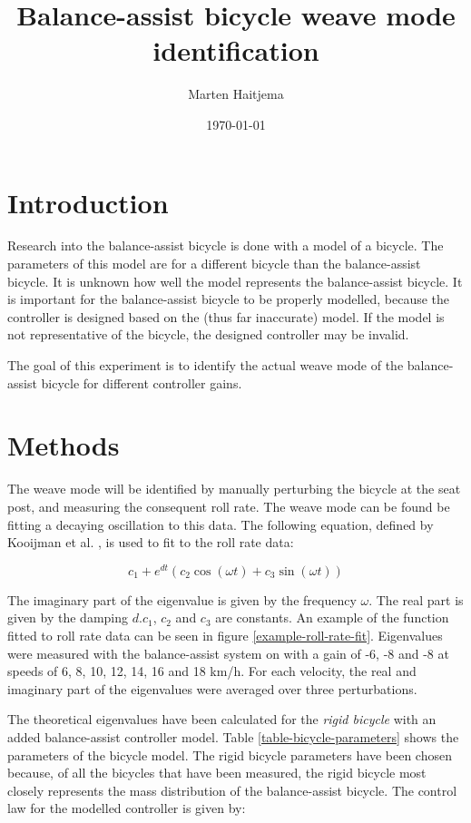 \documentclass[12pt]{article}
\title{Balance-assist bicycle weave mode identification}
\author{Marten Haitjema}
\date{\today}
\begin{document}
\maketitle

\section{Introduction}
Research into the balance-assist bicycle is done with a model of a bicycle. The parameters of this
model are for a different bicycle than the balance-assist bicycle. It is unknown how well the model
represents the balance-assist bicycle. It is important for the balance-assist bicycle to be
properly modelled, because the controller is designed based on the (thus far inaccurate) model. If
the model is not representative of the bicycle, the designed controller may be invalid.

The goal of this experiment is to identify the actual weave mode of the balance-assist bicycle for
different controller gains.

\section{Methods}
The weave mode will be identified by manually perturbing the bicycle at the seat post, and
measuring the consequent roll rate. The weave mode can be found be fitting a decaying oscillation
to this data. The following equation, defined by Kooijman et al. \cite{Kooijman2008}, is used to
fit to the roll rate data:

\begin{equation}
    c_1 + e^{dt} (c_2\cos(\omega t) + c_3\sin(\omega t))
    \label{kooijman-func}
\end{equation}

The imaginary part of the eigenvalue is given by the frequency $\omega$. The real part is given by
the damping $d$.$c_1$, $c_2$ and $c_3$ are constants. An example of the function fitted to roll
rate data can be seen in figure \ref{example-roll-rate-fit}. Eigenvalues were measured with the
balance-assist system on with a gain of -6, -8 and -8 at speeds of 6, 8, 10, 12, 14, 16 and 18
km/h. For each velocity, the real and imaginary part of the eigenvalues were averaged over three
perturbations.

The theoretical eigenvalues have been calculated for the \emph{rigid bicycle} with an added
balance-assist controller model. Table \ref{table-bicycle-parameters} shows the parameters of the
bicycle model. The rigid bicycle parameters have been chosen because, of all the bicycles that have
been measured, the rigid bicycle most closely represents the mass distribution of the
balance-assist bicycle. The control law for the modelled controller is given by:
\end{document}

